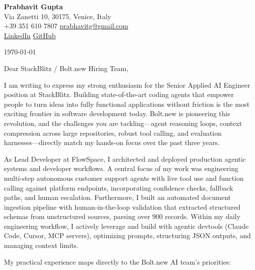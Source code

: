\documentclass[11pt,a4paper]{article}
\begin{document}
\begin{center}
    {\huge \textbf{Prabhavit Gupta}} \\
    \vspace{4pt}
    Via Zanetti 10, 30175, Venice, Italy \\
    +39 351 610 7807 \textbar{} \href{mailto:prabhavitg@gmail.com}{prabhavitg@gmail.com} \\
    \href{https://www.linkedin.com/in/prabhavit/}{LinkedIn} \textbar{} \href{https://github.com/prab-gupta}{GitHub}
\end{center}

\vspace{14pt}

\noindent \today

\vspace{6pt}

\noindent Dear StackBlitz / Bolt.new Hiring Team,

\vspace{6pt}

\noindent I am writing to express my strong enthusiasm for the Senior Applied AI Engineer position at StackBlitz. Building state-of-the-art coding agents that empower people to turn ideas into fully functional applications without friction is the most exciting frontier in software development today. Bolt.new is pioneering this revolution, and the challenges you are tackling—agent reasoning loops, context compression across large repositories, robust tool calling, and evaluation harnesses—directly match my hands-on focus over the past three years.

\noindent As Lead Developer at FlowSpace, I architected and deployed production agentic systems and developer workflows. A central focus of my work was engineering multi-step autonomous customer support agents with live tool use and function calling against platform endpoints, incorporating confidence checks, fallback paths, and human escalation. Furthermore, I built an automated document ingestion pipeline with human-in-the-loop validation that extracted structured schemas from unstructured sources, parsing over 900 records. Within my daily engineering workflow, I actively leverage and build with agentic devtools (Claude Code, Cursor, MCP servers), optimizing prompts, structuring JSON outputs, and managing context limits.

\noindent My practical experience maps directly to the Bolt.new AI team's priorities:
\end{document}

